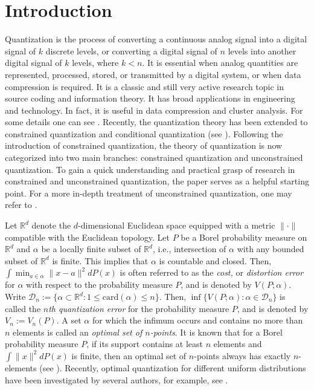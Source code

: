 \documentclass[12pt, reqno]{amsart}
\theoremstyle{plain}
\theoremstyle{definition}
\newcommand{\sci}{\subset}%
\newcommand{\set}[1]{\{#1\}}%
\newcommand{\ga}{\alpha}
\newcommand{\tit}{\textit}%
\newcommand{\C}[1]{\mathcal{#1}}%
\newcommand{\D}[1]{\mathbb{#1}}%
\newcommand{\te}{\text}%
\begin{document}
\section{Introduction}


Quantization is the process of converting a continuous analog signal into a digital signal of $k$ discrete levels, or converting a digital signal of $n$ levels into another digital signal of $k$ levels, where $k < n$.
It is essential when analog quantities are represented, processed, stored, or transmitted by a digital system, or when data compression is required. It is a classic and still very active research topic in source coding and information theory. It has broad applications in engineering and technology. In fact, it is useful in data compression and cluster analysis. For some details one can see  \cite{DFG, GG, GL1, GN,  P, Z1, Z2}. Recently, the quantization theory has been extended to constrained quantization and conditional quantization (see \cite{PR1,PR2, PR3}). Following the introduction of constrained quantization, the theory of quantization is now categorized into two main branches: constrained quantization and unconstrained quantization.
To gain a quick understanding and practical grasp of research in constrained and unconstrained quantization, the paper \cite{PR1} serves as a helpful starting point. For a more in-depth treatment of unconstrained quantization, one may refer to \cite{GL2}. 


Let $\D R^d$ denote the $d$-dimensional Euclidean space equipped with a metric $\|\cdot\|$ compatible with the Euclidean topology. Let $P$ be a Borel probability measure on $\D R^d$ and $\ga$ be a locally finite subset of $\D R^d$, i.e., intersection of $\ga$ with any bounded subset of $\D R^d$ is finite. This implies that $\ga$ is countable and closed. 
Then, $\int \min_{a \in \ga} \|x-a\|^2 dP(x)$ is often referred to as the \tit{cost,} or \tit{distortion error} for $\ga$ with respect to the probability measure $P$, and is denoted by $V(P; \ga)$.  Write
$\C D_n:=\set{\ga \sci \D R^d : 1\leq \te{card}(\ga)\leq n}$.  Then, $\inf\set{V(P; \ga) : \ga \in \C D_n}$ is called the \tit{$n$th quantization error} for the probability measure $P$, and is denoted by $V_n:=V_n(P)$. A set $\ga$ for which the infimum occurs and contains no more than $n$ elements is called an \tit{optimal set of $n$-points}. It is known that for a Borel probability measure $P$,  if its support contains at least $n$ elements and $\int \| x\|^2 dP(x)$ is finite, then an optimal set of $n$-points always has exactly $n$-elements (see \cite{ GL1, GL2, GKL, AW}). 
Recently, optimal quantization for different uniform distributions have been investigated by several authors, for example, see \cite{DR, PRRSS, R, RR, RS}.
\end{document}
